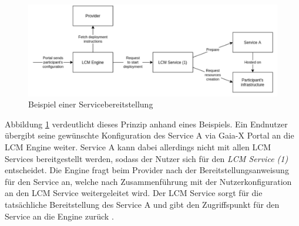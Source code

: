 \begin{figure}[h]
  \centering
  \includegraphics[width=\textwidth]{gfx/chapters/4_gaia-X/example_deployment.png}
  \caption{Beispiel einer Servicebereitstellung}
  \label{fig:gaia-x-example_deployment}
\end{figure}
Abbildung \ref{fig:gaia-x-example_deployment} verdeutlicht dieses Prinzip anhand eines Beispiels.
Ein Endnutzer übergibt seine gewünschte Konfiguration des Service A via Gaia-X Portal an die \ac{LCM} Engine weiter.
Service A kann dabei allerdings nicht mit allen LCM Services bereitgestellt werden,
sodass der Nutzer sich für den \emph{\ac{LCM} Service (1)} entscheidet.
Die Engine fragt beim Provider nach der Bereitstellungsanweisung für den Service an, 
welche nach Zusammenführung mit der Nutzerkonfiguration an den \ac{LCM} Service weitergeleitet wird.
Der \ac{LCM} Service sorgt für die tatsächliche Bereitstellung des Service A 
und gibt den Zugriffspunkt für den Service an die Engine zurück \cite{ORC2021}.
